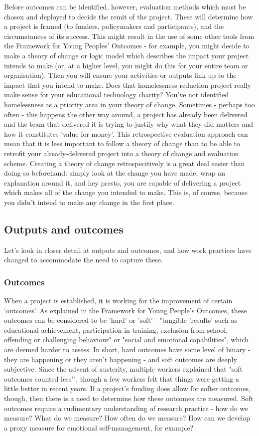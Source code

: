 Before outcomes can be identified, however, evaluation methods which must be chosen and deployed to decide the remit of the project. These will determine how a project is framed (to funders, policymakers and participants), and the circumstances of its success. This might result in the use of some other tools from the Framework for Young Peoples' Outcomes - for example, you might decide to make a theory of change or logic model which describes the impact your project intends to make (or, at a higher level, you might do this for your entire team or organisation). Then you will ensure your activities or outputs link up to the impact that you intend to make. Does that homelessness reduction project really make sense for your educational technology charity? You've not identified homelessness as a priority area in your theory of change. Sometimes - perhaps too often - this happens the other way around, a project has already been delivered and the team that delivered it is trying to justify why what they did matters and how it constitutes 'value for money'. This retrospective evaluation approach can mean that it is less important to follow a theory of change than to be able to retrofit your already-delivered project into a theory of change and evaluation scheme. Creating a theory of change retrospecitively is a great deal easier than doing so beforehand: simply look at the change you have made, wrap an explanation around it, and hey presto, you are capable of delivering a project which makes all of the change you intended to make. This is, of course, because you didn't intend to make any change in the first place.

\subsection{Outputs and outcomes}
Let's look in closer detail at outputs and outcomes, and how work practices have changed to accommodate the need to capture these.

\subsubsection{Outcomes}
When a project is established, it is working for the improvement of certain ‘outcomes’. As explained in the Framework for Young People's Outcomes, these outcomes can be considered to be 'hard' or 'soft' - "tangible 'results' such as educational achievement, participation in training, exclusion from school, offending or challenging behaviour" or "social and emotional capabilities", which are deemed harder to assess. In short, hard outcomes have some level of binary - they are happening or they aren't happening - and soft outcomes are deeply subjective. Since the advent of austerity, multiple workers explained that "soft outcomes counted less’", though a few workers felt that things were getting a little better in recent years. If a project's funding does allow for softer outcomes, though, then there is a need to determine how these outcomes are measured. Soft outcomes require a rudimentary understanding of research practice - how do we measure? What do we measure? How often do we measure? How can we develop a proxy measure for emotional self-management, for example?


